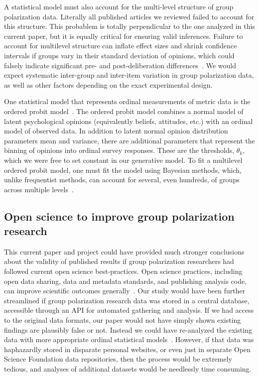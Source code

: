 A statistical model must also account for the multi-level structure of
group polarization data. Literally all published articles we reviewed failed
to account for this structure. This probablem is totally perpendicular to the
one analyzed in this current paper, but it is equally critical for ensuring
valid inferences. Failure to account for multilevel structure can inflate effect sizes and
shrink confidence intervals if groups vary in their standard deviation of
opinions, which could falsely indicate significant
pre- and post-deliberation differences~\cite{GelmanHillRegression,Yarkoni2021}. 
We would expect systematic inter-group and inter-item variation in group polarization data, 
as well as other factors depending on the exact experimental design.

One statistical model that represents ordinal measurements of metric
data is the ordered probit model~\cite[Ch. 23]{Kruschke2015}. 
The ordered probit model combines a normal
model of latent psychological opinions (equivalently beliefs, attitudes, etc.)
with an ordinal model of observed data.  In addition to latent normal opinion 
distribution parameters mean and variance, there are additional parameters that represent
the binning of opinions into ordinal survey responses. 
These are the thresholds, $\theta_k$, which we were free 
to set constant in our generative model.
To fit a multilevel ordered probit model, one must fit the model
using Bayesian methods, which, unlike frequentist methods, can account for several,
even hundreds, of groups across multiple levels~\cite{Liddell2018}.


\subsection{Open science to improve group polarization research}

This current paper and project could have provided much stronger conclusions
about the validity of published results if group polarization researchers had 
followed current open science best-practices.
Open science practices, including open data sharing, data and metadata standards,
and publishing analysis code, can improve scientific outcomes 
generally~\cite{Hart2016,Smaldino2019,Samuel2021}.
Our study would have been further streamlined if group polarization research data was
stored in a central database, accessible through an API for automated gathering
and analysis. If we had access to the original data formats, our paper would not have 
simply shown existing findings are plausibly false or not. Instead we could have
re-analyzed the existing data with more appropriate ordinal statistical 
models~\cite{Liddell2018}.  However, if that data was haphazardly stored in
disparate personal websites, or even just in separate Open Science Foundation 
data repositories, then the process would be extremely tedious, and 
analyses of additional datasets would be needlessly time consuming. 



